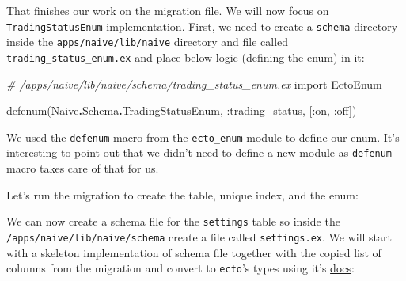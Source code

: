 \documentclass[
]{book}
\newenvironment{Shaded}{\begin{snugshade}}{\end{snugshade}}
\newcommand{\CommentTok}[1]{\textcolor[rgb]{0.56,0.35,0.01}{\textit{#1}}}
\newcommand{\ConstantTok}[1]{\textcolor[rgb]{0.00,0.00,0.00}{#1}}
\newcommand{\ExtensionTok}[1]{#1}
\newcommand{\ImportTok}[1]{#1}
\newcommand{\NormalTok}[1]{#1}
\newcommand{\OperatorTok}[1]{\textcolor[rgb]{0.81,0.36,0.00}{\textbf{#1}}}
\newcommand{\StringTok}[1]{\textcolor[rgb]{0.31,0.60,0.02}{#1}}
\newcommand{\VariableTok}[1]{\textcolor[rgb]{0.00,0.00,0.00}{#1}}
\begin{document}
That finishes our work on the migration file. We will now focus on \texttt{TradingStatusEnum} implementation. First, we need to create a \texttt{schema} directory inside the \texttt{apps/naive/lib/naive} directory and file called \texttt{trading\_status\_enum.ex} and place below logic (defining the enum) in it:

\begin{Shaded}
\begin{Highlighting}[]
\CommentTok{\# /apps/naive/lib/naive/schema/trading\_status\_enum.ex}
\ImportTok{import} \ConstantTok{EctoEnum}

\NormalTok{defenum(}\ConstantTok{Naive}\OperatorTok{.}\ConstantTok{Schema}\OperatorTok{.}\ConstantTok{TradingStatusEnum}\NormalTok{, }\VariableTok{:trading\_status}\NormalTok{, [}\VariableTok{:on}\NormalTok{, }\VariableTok{:off}\NormalTok{])}
\end{Highlighting}
\end{Shaded}

We used the \texttt{defenum} macro from the \texttt{ecto\_enum} module to define our enum. It's interesting to point out that we didn't need to define a new module as \texttt{defenum} macro takes care of that for us.

Let's run the migration to create the table, unique index, and the enum:

\begin{Shaded}
\end{Shaded}

We can now create a schema file for the \texttt{settings} table so inside the \texttt{/apps/naive/lib/naive/schema} create a file called \texttt{settings.ex}. We will start with a skeleton implementation of schema file together with the copied list of columns from the migration and convert to \texttt{ecto}'s types using it's \href{https://hexdocs.pm/ecto/Ecto.Schema.html\#module-primitive-types}{docs}:
\end{document}
